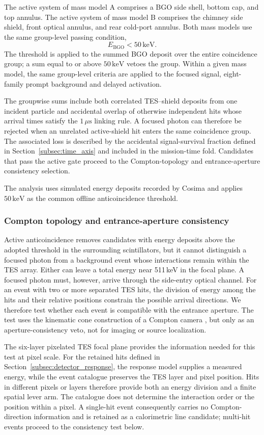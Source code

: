\documentclass[11pt]{article}
\newcommand{\keV}{\ensuremath{\,\mathrm{keV}}}
\begin{document}
The active system of mass model A comprises a BGO side shell, bottom cap, and
top annulus. The active system of mass model B comprises the chimney side
shield, front optical annulus, and rear cold-port annulus. Both mass models use
the same group-level passing condition,
\[
 E_{\mathrm{BGO}}<50\keV .
\]
The threshold is applied to the summed BGO deposit over the entire coincidence
group; a sum equal to or above $50\keV$ vetoes the group.
Within a given mass model, the same group-level criteria are applied to the
focused signal, eight-family prompt background and delayed
activation.

The groupwise sums include both correlated TES--shield deposits from one
incident particle and accidental overlap of otherwise independent hits whose
arrival times satisfy the $1\,\mu\mathrm{s}$ linking rule. A focused photon can
therefore be rejected when an unrelated active-shield hit enters the same
coincidence group. The associated loss is described by the accidental
signal-survival fraction defined in Section~\ref{subsec:time_axis} and included
in the mission-time fold. Candidates that pass the active gate proceed to the
Compton-topology and entrance-aperture consistency selection.

The analysis uses simulated energy deposits recorded by Cosima and applies
$50\keV$ as the common offline anticoincidence threshold.

\subsubsection{Compton topology and entrance-aperture consistency}

Active anticoincidence removes candidates with energy deposits above the adopted
threshold in the surrounding scintillators, but it cannot distinguish a focused photon from a
background event whose interactions remain within the TES array. Either can
leave a total energy near 511\,keV in the focal plane. A focused photon must,
however, arrive through the side-entry optical channel. For an event with two
or more separated TES hits, the division of energy among the hits and their
relative positions constrain the possible arrival directions. We therefore test
whether each event is compatible with the entrance aperture. The test uses the
kinematic cone construction of a Compton camera
\cite{Zoglauer2006}, but only as an aperture-consistency veto, not for imaging
or source localization.

The six-layer pixelated TES focal plane provides the information needed for
this test at pixel scale. For the retained hits defined in
Section~\ref{subsec:detector_response}, the response model supplies a measured
energy, while the event catalogue preserves the TES layer and pixel position.
Hits in different pixels or layers therefore provide both an energy division
and a finite spatial lever arm. The catalogue does not determine the interaction
order or the position within a pixel. A single-hit event consequently carries
no Compton-direction information and is retained as a calorimetric line
candidate; multi-hit events proceed to the consistency test below.
\end{document}
